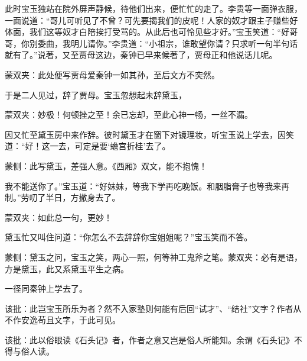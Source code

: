 \begin{parag}
    此时宝玉独站在院外屏声静候，待他们出来，便忙忙的走了。李贵等一面弹衣服，一面说道：“哥儿可听见了不曾？可先要揭我们的皮呢！人家的奴才跟主子赚些好体面，我们这等奴才白陪挨打受骂的。从此后也可怜见些才好。”宝玉笑道：“好哥哥，你别委曲，我明儿请你。”李贵道：“小祖宗，谁敢望你请？只求听一句半句话就有了。”说著，又至贾母这边，秦钟已早来候著了，贾母正和他说话儿呢。\begin{note}蒙双夹：此处便写贾母爱秦钟一如其孙，至后文方不突然。\end{note}于是二人见过，辞了贾母。宝玉忽想起未辞黛玉，\begin{note}蒙双夹：妙极！何顿挫之至！余已忘却，至此心神一畅，一丝不漏。\end{note}因又忙至黛玉房中来作辞。彼时黛玉才在窗下对镜理妆，听宝玉说上学去，因笑道：“好！这一去，可定是要‘蟾宫折桂’去了。\begin{note}蒙侧：此写黛玉，差强人意。《西厢》双文，能不抱愧！\end{note}我不能送你了。”宝玉道：“好妹妹，等我下学再吃晚饭。和胭脂膏子也等我来再制。”劳叨了半日，方撤身去了。\begin{note}蒙双夹：如此总一句，更妙！\end{note}黛玉忙又叫住问道：“你怎么不去辞辞你宝姐姐呢？”宝玉笑而不答。\begin{note}蒙侧：黛玉之问，宝玉之笑，两心一照，何等神工鬼斧之笔。蒙双夹：必有是语，方是黛玉，此又系黛玉平生之病。\end{note}一径同秦钟上学去了。\begin{note}该批：此岂宝玉所乐为者？然不入家塾则何能有后回“试才”、“结社”文字？作者从不作安逸苟且文字，于此可见。\end{note}\begin{note}该批：此以俗眼读《石头记》者，作者之意又岂是俗人所能知。余谓《石头记》不得与俗人读。\end{note}
\end{parag}



